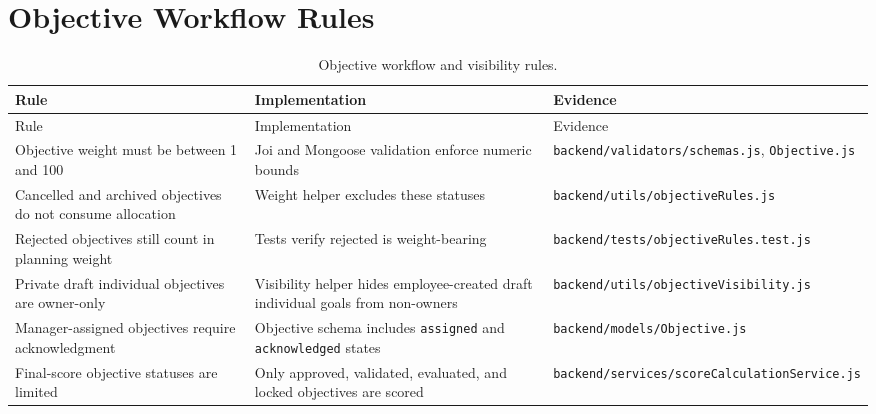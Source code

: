 \section{Objective Workflow Rules}
\begin{longtable}{p{}p{}p{}}
\caption{Objective workflow and visibility rules.}\label{tab:objective-rules}\\
\toprule
Rule & Implementation & Evidence\\
\midrule
\endfirsthead
\toprule
Rule & Implementation & Evidence\\
\midrule
\endhead
Objective weight must be between 1 and 100 & Joi and Mongoose validation enforce numeric bounds & \texttt{backend/validators/schemas.js}, \texttt{Objective.js}\\
Cancelled and archived objectives do not consume allocation & Weight helper excludes these statuses & \texttt{backend/utils/objectiveRules.js}\\
Rejected objectives still count in planning weight & Tests verify rejected is weight-bearing & \texttt{backend/tests/objectiveRules.test.js}\\
Private draft individual objectives are owner-only & Visibility helper hides employee-created draft individual goals from non-owners & \texttt{backend/utils/objectiveVisibility.js}\\
Manager-assigned objectives require acknowledgment & Objective schema includes \texttt{assigned} and \texttt{acknowledged} states & \texttt{backend/models/Objective.js}\\
Final-score objective statuses are limited & Only approved, validated, evaluated, and locked objectives are scored & \texttt{backend/services/scoreCalculationService.js}\\
\bottomrule
\end{longtable}

